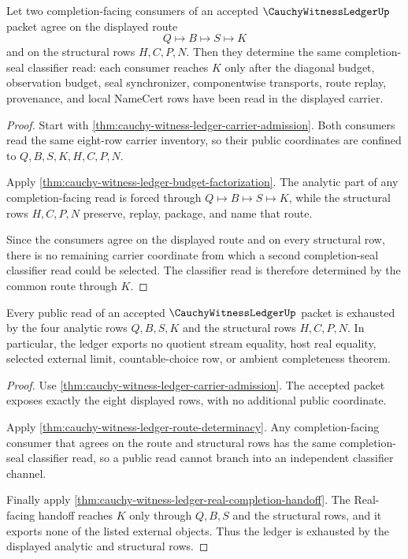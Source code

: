 \begin{theorem}
\label{thm:cauchy-witness-ledger-route-determinacy}
Let two completion-facing consumers of an accepted $\CauchyWitnessLedgerUp$ packet agree on the displayed route
$$
Q \longmapsto B \longmapsto S \longmapsto K
$$
and on the structural rows $H,C,P,N$. Then they determine the same completion-seal classifier read: each consumer reaches $K$ only after the diagonal budget, observation budget, seal synchronizer, componentwise transports, route replay, provenance, and local NameCert rows have been read in the displayed carrier.
\end{theorem}
\begin{proof}
Start with \autoref{thm:cauchy-witness-ledger-carrier-admission}. Both consumers read the same eight-row carrier inventory, so their public coordinates are confined to $Q,B,S,K,H,C,P,N$.

Apply \autoref{thm:cauchy-witness-ledger-budget-factorization}. The analytic part of any completion-facing read is forced through $Q \longmapsto B \longmapsto S \longmapsto K$, while the structural rows $H,C,P,N$ preserve, replay, package, and name that route.

Since the consumers agree on the displayed route and on every structural row, there is no remaining carrier coordinate from which a second completion-seal classifier read could be selected. The classifier read is therefore determined by the common route through $K$.
\end{proof}

\begin{theorem}
\label{thm:cauchy-witness-ledger-ledger-exhaustion}
Every public read of an accepted $\CauchyWitnessLedgerUp$ packet is exhausted by the four analytic rows $Q,B,S,K$ and the structural rows $H,C,P,N$. In particular, the ledger exports no quotient stream equality, host real equality, selected external limit, countable-choice row, or ambient completeness theorem.
\end{theorem}
\begin{proof}
Use \autoref{thm:cauchy-witness-ledger-carrier-admission}. The accepted packet exposes exactly the eight displayed rows, with no additional public coordinate.

Apply \autoref{thm:cauchy-witness-ledger-route-determinacy}. Any completion-facing consumer that agrees on the route and structural rows has the same completion-seal classifier read, so a public read cannot branch into an independent classifier channel.

Finally apply \autoref{thm:cauchy-witness-ledger-real-completion-handoff}. The Real-facing handoff reaches $K$ only through $Q,B,S$ and the structural rows, and it exports none of the listed external objects. Thus the ledger is exhausted by the displayed analytic and structural rows.
\end{proof}

